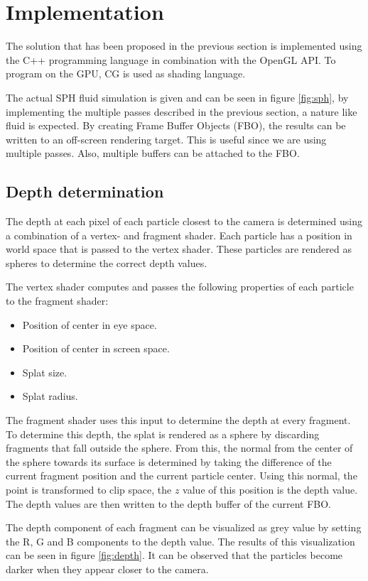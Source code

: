 \section{Implementation}
The solution that has been proposed in the previous section is implemented using the C++ programming language in combination with the OpenGL API.
To program on the GPU, CG is used as shading language.

The actual SPH fluid simulation is given and can be seen in figure \ref{fig:sph}, by implementing the multiple passes described in the previous section, a nature like fluid is expected.
By creating Frame Buffer Objects (FBO), the results can be written to an off-screen rendering target.
This is useful since we are using multiple passes.
Also, multiple buffers can be attached to the FBO.

\subsection{Depth determination}
The depth at each pixel of each particle closest to the camera is determined using a combination of a vertex- and fragment shader.
Each particle has a position in world space that is passed to the vertex shader.
These particles are rendered as spheres to determine the correct depth values.

The vertex shader computes and passes the following properties of each particle to the fragment shader:
\begin{itemize}
 	\item Position of center in eye space.
 	\item Position of center in screen space.
 	\item Splat size.
 	\item Splat radius.
 \end{itemize} 

The fragment shader uses this input to determine the depth at every fragment.
To determine this depth, the splat is rendered as a sphere by discarding fragments that fall outside the sphere.
From this, the normal from the center of the sphere towards its surface is determined by taking the difference of the current fragment position and the current particle center.
Using this normal, the point is transformed to clip space, the $z$ value of this position is the depth value.
The depth values are then written to the depth buffer of the current FBO.

The depth component of each fragment can be visualized as grey value by setting the R, G and B components to the depth value.
The results of this visualization can be seen in figure \ref{fig:depth}.
It can be observed that the particles become darker when they appear  closer to the camera.

